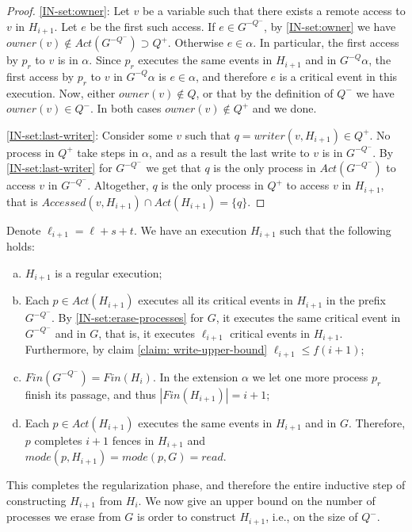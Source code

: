 \begin{proof}
	\ref{IN-set:owner}: Let $v$ be a variable such that there exists a remote access to $v$ in $H_{i+1}$. Let $e$ be the first such access. If $e \in G^{-Q^-}$, by \ref{IN-set:owner} we have $owner(v) \notin Act(G^{-Q^-}) \supset Q^+$. Otherwise $e \in \alpha$. In particular, the first access by $p_r$ to $v$ is in $\alpha$. Since $p_r$ executes the same events in $H_{i+1}$ and in $G^{-Q} \alpha$, the first access by $p_r$ to $v$ in $G^{-Q} \alpha$ is $e \in \alpha$, and therefore $e$ is a critical event in this execution. Now, either $owner(v) \notin Q$, or that by the definition of $Q^-$ we have $owner(v) \in Q^-$. In both cases $owner(v) \notin Q^+$ and we done.
	
	\ref{IN-set:last-writer}: Consider some $v$ such that $q = writer(v,H_{i+1}) \in Q^+$. No process in $Q^+$ take steps in $\alpha$, and as a result the last write to $v$ is in $G^{-Q^-}$. By \ref{IN-set:last-writer} for $G^{-Q^-}$ we get that $q$ is the only process in $Act(G^{-Q^-})$ to access $v$ in $G^{-Q^-}$. Altogether, $q$ is the only process in $Q^+$ to access $v$ in $H_{i+1}$, that is $Accessed(v,H_{i+1}) \cap Act(H_{i+1}) = \{q\}$.
\end{proof}

Denote $\ell_{i+1} = \ell+s+t$. We have an execution $H_{i+1}$ such that the following holds:
\begin{enumerate}[(a)]
	\item $H_{i+1}$ is a regular execution;
	\item Each $p \in Act(H_{i+1})$ executes all its critical events in $H_{i+1}$ in the prefix $G^{-Q^-}$. By \ref{IN-set:erase-processes} for $G$, it executes the same critical event in $G^{-Q^-}$ and in $G$, that is, it executes $\ell_{i+1}$ critical events in $H_{i+1}$. Furthermore, by claim \ref{claim: write-upper-bound} $\ell_{i+1} \leq f(i+1)$;
	\item $Fin(G^{-Q^-}) = Fin(H_i)$. In the extension $\alpha$ we let one more process $p_r$ finish its passage, and thus $|Fin(H_{i+1})| = i+1$;
	\item Each $p \in Act(H_{i+1})$ executes the same events in $H_{i+1}$ and in $G$. Therefore, $p$ completes $i+1$ fences in $H_{i+1}$ and $mode(p,H_{i+1}) = mode(p,G) = read$.
\end{enumerate}

This completes the regularization phase, and therefore the entire inductive step of constructing $H_{i+1}$ from $H_i$. We now give an upper bound on the number of processes we erase from $G$ is order to construct $H_{i+1}$, i.e., on the size of $Q^-$.

